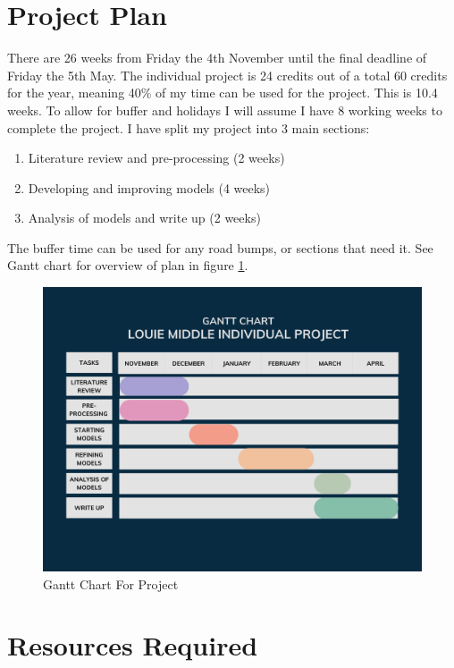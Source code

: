 \documentclass[12pt,a4paper]{report}
\begin{document}
\section{Project Plan}

There are 26 weeks from Friday the 4th November until the final deadline of Friday the 5th May. 
The individual project is 24 credits out of a total 60 credits for the year, meaning 40\% of my time can be used for the project. 
This is 10.4 weeks. 
To allow for buffer and holidays I will assume I have 8 working weeks to complete the project. 
I have split my project into 3 main sections:

\begin{enumerate}
    \item Literature review and pre-processing (2 weeks)
    \item Developing and improving models (4 weeks)
    \item Analysis of models and write up (2 weeks)
\end{enumerate}

The buffer time can be used for any road bumps, or sections that need it. 
See Gantt chart for overview of plan in figure \ref{fig:gantt_chart}.

\begin{figure}
    \centering
    \includegraphics[width=\linewidth]{Gantt Chart.png}
    \caption{Gantt Chart For Project}
    \label{fig:gantt_chart}
\end{figure}

\section{Resources Required}
\end{document}
